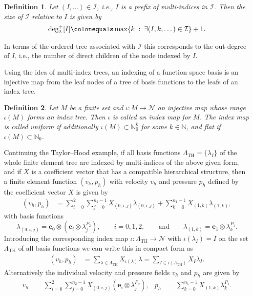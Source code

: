 \documentclass[a4paper,10pt,headings=normal,bibliography=totoc]{scrartcl}
\newtheorem{definition}{Definition}
\newcommand{\op}[1]{\operatorname{#1}}
\newcommand{\st}{\; : \;}
\begin{document}
\begin{definition}
Let $(I,\dots) \in \mathcal{I}$, i.e., $I$ is a
prefix of multi-indices in $\mathcal{I}$. Then the size of $\mathcal{I}$ relative
to $I$ is given by
\begin{align}\label{eq:prefix_size}
  \operatorname{deg}^+_{\mathcal{I}}[I] \colonequals  \op{max}\{k \st \exists (I,k,\dots) \in \mathcal{I} \}+1.
\end{align}
\end{definition}
In terms of the ordered tree associated with $\mathcal{I}$ this corresponds
to the out-degree of $I$, i.e., the number of direct children of the node indexed by $I$.

Using the idea of multi-index trees,
an indexing of a function space basis is an injective map from the leaf nodes of a tree of basis functions to the leafs of an
index tree.

\begin{definition}
\label{def:index_map}
  Let $M$ be a finite set and $\iota:M \to \mathcal{N}$ an injective map whose range
  $\iota(M)$ forms an index tree.
  Then $\iota$ is called an \emph{index map} for $M$.
  The index map is called \emph{uniform} if additionally $\iota(M) \subset \mathbb{N}^k_0$ for some $k \in \mathbb{N}$,
  and \emph{flat} if $\iota(M) \subset \mathbb{N}_0$.
\end{definition}

Continuing the Taylor--Hood example, if
all basis functions $\Lambda_\text{TH} = \{\lambda_I \}$ of the whole finite element tree are
indexed by multi-indices of the above given form,
and if $X$ is a coefficient vector that has a compatible hierarchical structure,
then a finite element function $(v_h,p_h)$ with velocity
$v_h$ and pressure $p_h$ defined by the coefficient vector $X$
is given by
\begin{align}
\label{eq:linear_combination}
  (v_h,p_h)
  &= \sum_{i=0}^2\sum_{j=0}^{n_2-1} X_{(0,i,j)}\lambda_{(0,i,j)}
  + \sum_{k=0}^{n_1-1} X_{(1,k)}\lambda_{(1,k)},
\end{align}
with basis functions
\begin{equation*}
  \lambda_{(0,i,j)} = \mathbf{e}_0 \otimes (\mathbf{e}_i \otimes \lambda^{P_2}_j), \qquad i=0,1,2,
    \qquad \text{and} \qquad
    \lambda_{(1,k)} = \mathbf{e}_1 \otimes \lambda^{P_1}_k.
\end{equation*}
Introducing the corresponding index map $\iota : \Lambda_{\text{TH}} \to \mathcal{N}$
with $\iota(\lambda_I)=I$ on the set $\Lambda_{\text{TH}}$ of all basis functions
we can write this in compact form as
\begin{align*}
  (v_h,p_h) &= \sum_{\lambda \in \Lambda_{\text{TH}}} X_{\iota(\lambda)} \lambda
            = \sum_{I \in \iota(\Lambda_{\text{TH}})} X_I \lambda_I.
\end{align*}
Alternatively the individual velocity and pressure fields
$v_h$ and $p_h$ are given by
\begin{align*}
  v_h &= \sum_{i=0}^2 \sum_{j=0}^{n_2-1} X_{(0,i,j)} (\mathbf{e}_i \otimes \lambda^{P_2}_j),
    &
    p_h &= \sum_{k=0}^{n_1-1} X_{(1,k)}\lambda^{P_1}_k.
\end{align*}
\end{document}
